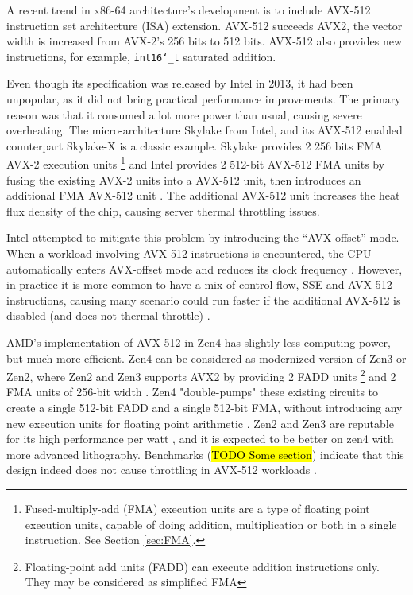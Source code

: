 \documentclass[logo,bsc,singlespacing,parskip]{infthesis}
\newcommand{\dtshort}{\texttt{int16\char`_t} }
\begin{document}
A recent trend in x86-64 architecture’s development is to include AVX-512
instruction set architecture (ISA) extension. AVX-512 succeeds AVX2, the vector
width is increased from AVX-2’s 256 bits to 512 bits. AVX-512 also provides new
instructions, for example, \dtshort saturated addition.


Even though its specification was released by Intel in 2013, it had been
unpopular, as it did not bring practical performance improvements. The primary
reason was that it consumed a lot more power than usual, causing severe
overheating. The micro-architecture Skylake from Intel, and its AVX-512 enabled
counterpart Skylake-X is a classic example. Skylake provides 2 256 bits FMA
AVX-2 execution units 
\footnote{Fused-multiply-add (FMA) execution units are a type of
floating point execution units, capable of doing addition, multiplication or
both in a single instruction. See Section \ref{sec:FMA}.} 
and Intel provides 2 512-bit AVX-512 FMA units by
fusing the existing AVX-2 units into a AVX-512 unit, then introduces an
additional FMA AVX-512 unit \cite{SLK-X}. The additional AVX-512 unit increases
the heat flux density of the chip, causing server thermal throttling issues. 

Intel attempted to mitigate this problem by introducing the ``AVX-offset'' mode.
When a workload involving AVX-512 instructions is encountered, the CPU
automatically enters AVX-offset mode and reduces its clock frequency
\cite{AVX-offset}. However, in practice it is more common to have a mix of
control flow, SSE and AVX-512 instructions, causing many scenario could run
faster if the additional AVX-512 is disabled (and does not thermal throttle)
\cite{Zen4Critique}.

AMD’s implementation of AVX-512 in Zen4 has slightly less computing power, but
much more efficient. Zen4 can be considered as modernized version of Zen3 or
Zen2, where Zen2 and Zen3 supports AVX2 by providing 2 FADD units
\footnote{Floating-point add units (FADD) can execute addition instructions
only. They may be considered as simplified FMA} and 2 FMA units of 256-bit width
\cite{Zen2ChipWiki}. Zen4 "double-pumps" these existing circuits to create a
single 512-bit FADD and a single 512-bit FMA, without introducing any new
execution units for floating point arithmetic \cite{Zen4Critique}. Zen2 and Zen3
are reputable for its high performance per watt \cite{ZenPerfPerWatt}, and it is
expected to be better on zen4 with more advanced lithography. Benchmarks
(\hl{TODO Some section}) indicate that this design indeed does not cause
throttling in AVX-512 workloads \cite{Zen4Critique}.
\end{document}

